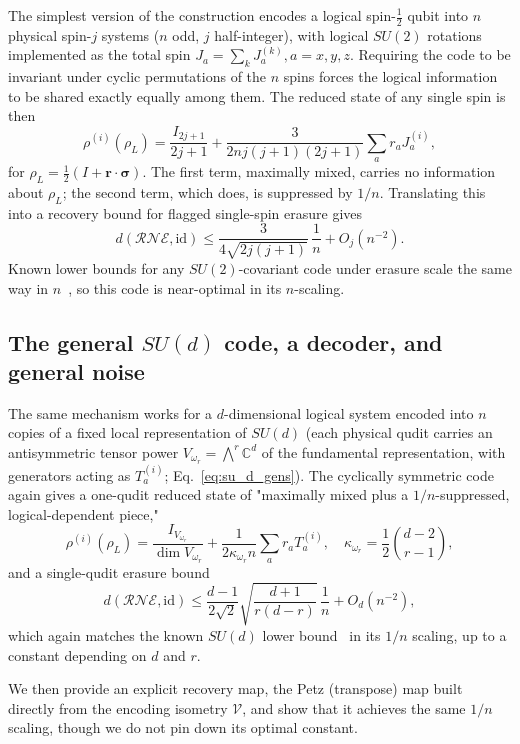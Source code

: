 \documentclass[10pt,twocolumn,superscriptaddress,aps,amsmath,amssymb,citeautoscript,floatfix,prx]{revtex4-2}
\theoremstyle{plain}
\theoremstyle{plain}
\theoremstyle{plain}
\theoremstyle{plain}
\theoremstyle{plain}
\theoremstyle{plain}
\theoremstyle{plain}
\theoremstyle{definition}
\theoremstyle{plain}
\begin{document}
The simplest version of the construction encodes a logical spin-$\tfrac12$ qubit into $n$ physical spin-$j$ systems ($n$ odd, $j$ half-integer), with logical $SU(2)$ rotations implemented as the total spin $J_a=\sum_k J_a^{(k)}, a=x, y, z$. 
Requiring the code to be invariant under cyclic permutations of the $n$ spins forces the logical information to be shared exactly equally among them. The reduced state of any single spin is then
$$
\rho^{(i)}(\rho_L)=\frac{I_{2j+1}}{2j+1}+\frac{3}{2nj(j+1)(2j+1)}\sum_a r_aJ_a^{(i)},
$$
for $\rho_L=\tfrac12(I+\mathbf r\cdot\boldsymbol\sigma)$. The first term, maximally mixed, carries no information about $\rho_L$; the second term, which does, is suppressed by $1/n$. 
Translating this into a recovery bound for flagged single-spin erasure gives
$$
d(\mathcal R\mathcal N\mathcal E,\mathrm{id})\le \frac{3}{4\sqrt{2j(j+1)}}\,\frac1n+O_{j}(n^{-2}).
$$
Known lower bounds for any $SU(2)$-covariant code under erasure scale the same way in $n$~\cite{Faist2020}, so this code is near-optimal in its $n$-scaling.
 
\subsection{The general \texorpdfstring{$SU(d)$}{SU(d)} code, a decoder, and general noise}\label{subsec:summary_sud}
 
The same mechanism works for a $d$-dimensional logical system encoded into $n$ copies of a fixed local representation of $SU(d)$ (each physical qudit carries an antisymmetric tensor power $V_{\omega_r}=\bigwedge^r\mathbb C^d$ of the fundamental representation, 
with generators acting as $T_a^{(i)}$; Eq.~\eqref{eq:su_d_gens}). The cyclically symmetric code again gives a one-qudit reduced state of "maximally mixed plus a $1/n$-suppressed, logical-dependent piece,"
$$
\rho^{(i)}(\rho_L)=\frac{I_{V_{\omega_r}}}{\dim V_{\omega_r}}+\frac{1}{2\kappa_{\omega_r}n}\sum_a r_aT_a^{(i)},\quad \kappa_{\omega_r}=\frac12\binom{d-2}{r-1},
$$
and a single-qudit erasure bound
$$
d(\mathcal R\mathcal N\mathcal E,\mathrm{id})\le \frac{d-1}{2\sqrt2}\sqrt{\frac{d+1}{r(d-r)}}\,\frac1n+O_{d}(n^{-2}),
$$
which again matches the known $SU(d)$ lower bound~\cite{Faist2020} in its $1/n$ scaling, up to a constant depending on $d$ and $r$.
 
We then provide an explicit recovery map, the Petz (transpose) map built directly from the encoding isometry $\mathcal{V}$, and show that it achieves the same $1/n$ scaling, though we do not pin down its optimal constant.
 
\end{document}
